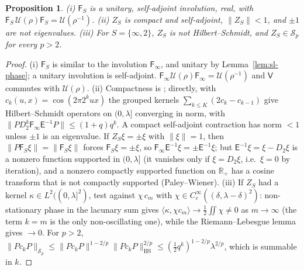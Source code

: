 \documentclass[11pt]{amsart}
\newtheorem{proposition}[theorem]{Proposition}
\theoremstyle{definition}
\theoremstyle{remark}
\newcommand{\R}{\mathbb R}
\begin{document}
\begin{proposition}\label{prop:sl-AS}
\emph{(i)} $\mathsf F_S$ is a unitary, self-adjoint involution, real, with $\mathsf F_S\,\mathcal U(\rho)\mathsf F_S=\mathcal U(\rho^{-1})$.
\emph{(ii)} $Z_S$ is compact and self-adjoint, $\|Z_S\|<1$, and $\pm1$ are not eigenvalues.
\emph{(iii)} For $S=\{\infty,2\}$, $Z_S$ is not Hilbert--Schmidt, and $Z_S\in\mathcal S_p$ for every $p>2$.
\end{proposition}
\begin{proof}
(i) $\mathsf F_S$ is similar to the involution $\mathsf F_\infty$, and unitary by Lemma~\ref{lem:sl-phase}; a unitary involution
is self-adjoint. $\mathsf F_\infty\mathcal U(\rho)\mathsf F_\infty=\mathcal U(\rho^{-1})$ and $\mathsf V$ commutes with $\mathcal U(\rho)$.
(ii) Compactness is \cite[Thms.~2.1, 4.4]{CCquasi2020}; directly, with $c_k(u,x)=\cos(2\pi2^kux)$ the grouped kernels
$\sum_{k\le K}(2c_k-c_{k-1})$ give Hilbert--Schmidt operators on $(0,\lambda]$ converging in norm, with
$\|PD_2^k\mathsf F_\infty\mathsf E^{-1}P\|\le(1+q)q^k$. A compact self-adjoint contraction has norm $<1$ unless $\pm1$ is an
eigenvalue. If $Z_S\xi=\pm\xi$ with $\|\xi\|=1$, then $\|P\mathsf F_S\xi\|=\|\mathsf F_S\xi\|$ forces $\mathsf F_S\xi=\pm\xi$, so
$\mathsf F_\infty\mathsf E^{-1}\xi=\pm\mathsf E^{-1}\xi$; but $\mathsf E^{-1}\xi=\xi-D_2\xi$ is a nonzero function supported in $(0,\lambda]$ (it
vanishes only if $\xi=D_2\xi$, i.e.\ $\xi=0$ by iteration), and a nonzero compactly supported function on $\R_+$ has a
cosine transform that is not compactly supported (Paley--Wiener).
(iii) If $Z_S$ had a kernel $\kappa\in L^2((0,\lambda]^2)$, test against $\chi\,c_m$ with $\chi\in C_c^\infty((\delta,\lambda-\delta)^2)$:
non-stationary phase in the lacunary sum gives $\langle\kappa,\chi c_m\rangle\to\frac12\iint\chi\ne0$ as $m\to\infty$ (the term
$k=m$ is the only non-oscillating one), while the Riemann--Lebesgue lemma gives $\to0$. For $p>2$,
$\|Pc_kP\|_{\mathcal S_p}\le\|Pc_kP\|^{1-2/p}\|Pc_kP\|_{\mathrm{HS}}^{2/p}\le(\tfrac12q^k)^{1-2/p}\lambda^{2/p}$, which is summable in $k$.
\end{proof}
\end{document}
